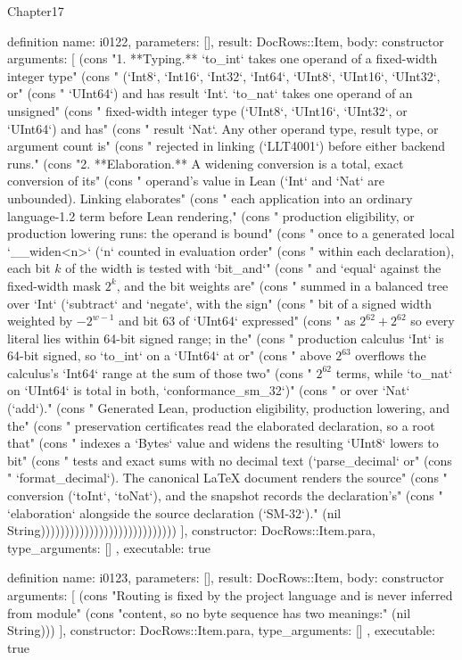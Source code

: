 \begin{lexlean}{Chapter17}
\begin{semanticmodule}
definition{
  name: i0122,
  parameters: [],
  result: DocRows::Item,
  body: constructor{
    arguments: [
      (cons "1. **Typing.** `to_int` takes one operand of a fixed-width integer type" (cons "   (`Int8`, `Int16`, `Int32`, `Int64`, `UInt8`, `UInt16`, `UInt32`, or" (cons "   `UInt64`) and has result `Int`. `to_nat` takes one operand of an unsigned" (cons "   fixed-width integer type (`UInt8`, `UInt16`, `UInt32`, or `UInt64`) and has" (cons "   result `Nat`. Any other operand type, result type, or argument count is" (cons "   rejected in linking (`LLT4001`) before either backend runs." (cons "2. **Elaboration.** A widening conversion is a total, exact conversion of its" (cons "   operand's value in Lean (`Int` and `Nat` are unbounded). Linking elaborates" (cons "   each application into an ordinary language-1.2 term before Lean rendering," (cons "   production eligibility, or production lowering runs: the operand is bound" (cons "   once to a generated local `__widen<n>` (`n` counted in evaluation order" (cons "   within each declaration), each bit $k$ of the width is tested with `bit_and`" (cons "   and `equal` against the fixed-width mask $2^k$, and the bit weights are" (cons "   summed in a balanced tree over `Int` (`subtract` and `negate`, with the sign" (cons "   bit of a signed width weighted by $-2^{w-1}$ and bit 63 of `UInt64` expressed" (cons "   as $2^{62} + 2^{62}$ so every literal lies within 64-bit signed range; in the" (cons "   production calculus `Int` is 64-bit signed, so `to_int` on a `UInt64` at or" (cons "   above $2^{63}$ overflows the calculus's `Int64` range at the sum of those two" (cons "   $2^{62}$ terms, while `to_nat` on `UInt64` is total in both, `conformance_sm_32`)" (cons "   or over `Nat` (`add`)." (cons "   Generated Lean, production eligibility, production lowering, and the" (cons "   preservation certificates read the elaborated declaration, so a root that" (cons "   indexes a `Bytes` value and widens the resulting `UInt8` lowers to bit" (cons "   tests and exact sums with no decimal text (`parse_decimal` or" (cons "   `format_decimal`). The canonical LaTeX document renders the source" (cons "   conversion (`toInt`, `toNat`), and the snapshot records the declaration's" (cons "   `elaboration` alongside the source declaration (`SM-32`)." (nil String))))))))))))))))))))))))))))
    ],
    constructor: DocRows::Item.para,
    type_arguments: []
  },
  executable: true
}

definition{
  name: i0123,
  parameters: [],
  result: DocRows::Item,
  body: constructor{
    arguments: [
      (cons "Routing is fixed by the project language and is never inferred from module" (cons "content, so no byte sequence has two meanings:" (nil String)))
    ],
    constructor: DocRows::Item.para,
    type_arguments: []
  },
  executable: true
}


\end{semanticmodule}
\end{lexlean}
